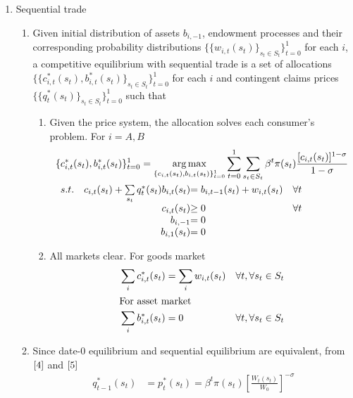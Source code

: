 \documentclass{article}
\DeclareMathOperator*{\argmax}{arg\,max}
\begin{document}
\begin{enumerate}
\begin{enumerate}
        \end{enumerate}
        \item Sequential trade
        \begin{enumerate}
            \item Given initial distribution of assets \(b_{i,-1}\), endowment processes and their corresponding probability distributions \(\{\{w_{i,t}(s_t)\}_{s_t\in S_t}\}_{t=0}^1\) for each \(i\),
            a competitive equilibrium with sequential trade is a set of allocations \(\{\{c_{i,t}^\ast(s_t),b_{i,t}^\ast(s_t)\}_{s_t\in S_t}\}_{t=0}^1\) 
            for each \(i\) and contingent claims prices \(\{\{q_{t}^\ast(s_t)\}_{s_t\in S_t}\}_{t=0}^1\) such that
        \begin{enumerate}
            \item Given the price system, the allocation solves each consumer's problem. For \(i=A,B\)
            \begin{align*}
                &\{c_{i,t}^\ast(s_t),b_{i,t}^\ast(s_t)\}_{t=0}^1=\argmax_{\{c_{i,t}(s_t),b_{i,t}(s_t)\}_{t=0}^1}\sum_{t=0}^1\sum_{s_t\in S_t}\beta^t\pi(s_t)\frac{[c_{i,t}(s_t)]^{1-\sigma}}{1-\sigma}\\
                &\begin{array}{r@{\quad}r@{}l@{\quad}l}
                s.t.&c_{i,t}(s_t)+\sum\limits_{s_t}q_{t}^\ast(s_t)b_{i,t}(s_t)&= b_{i,t-1}(s_t)+w_{i,t}(s_t)&\forall t\\
                &c_{i,t}(s_t)&\ge0 &\forall t\\
                &b_{i,-1}&=0\\
                &b_{i,1}(s_t)&=0
                \end{array} 
            \end{align*}
            \item All markets clear. For goods market 
            \begin{align*}
                &\sum_i c_{i,t}^\ast(s_t)=\sum_i w_{i,t}(s_t)&\forall t,\forall s_t\in S_t\\
                \intertext{For asset market}
                &\sum_i b_{i,t}^\ast(s_t)=0&\forall t,\forall s_t\in S_t
            \end{align*}
        \end{enumerate}
            \item Since date-0 equilibrium and sequential equilibrium are equivalent, from \(\eqref{4}\) and \(\eqref{5}\)
            \begin{align}
                q_{t-1}^\ast(s_t)&=p_t^\ast(s_t)=\beta^t\pi(s_t)\left[\frac{W_t(s_t)}{W_0}\right]^{-\sigma}\label{6}\\

\end{align}
\end{enumerate}
\end{enumerate}
\end{document}
